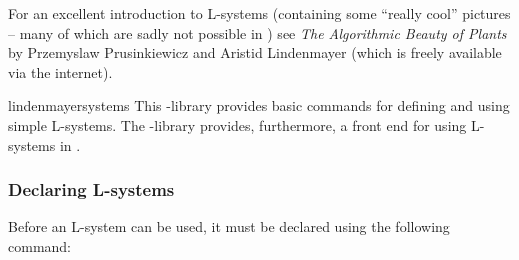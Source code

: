 For an excellent introduction to L-systems (containing some ``really cool''
pictures -- many of which are sadly not possible in \pgfname) see \emph{The
Algorithmic Beauty of Plants} by Przemyslaw Prusinkiewicz and Aristid
Lindenmayer (which is freely available via the internet).

\begin{pgflibrary}{lindenmayersystems}
    This \pgfname-library provides basic commands for defining and using simple
    L-systems. The \tikzname-library provides, furthermore, a front end for
    using L-systems in \tikzname.
\end{pgflibrary}


\subsubsection{Declaring L-systems}

Before an L-system can be used, it must be declared using the following
command:

